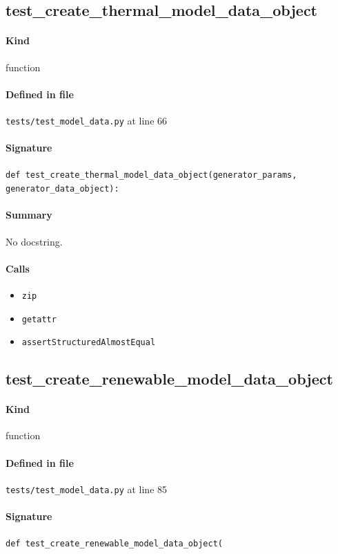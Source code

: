 \documentclass[11pt]{report}
\begin{document}
\subsection{test\_create\_thermal\_model\_data\_object}
\label{def:tests-test_model_data.py:test_create_thermal_model_data_object:L66}
\paragraph{Kind} function
\paragraph{Defined in file} \texttt{tests/test\_model\_data.py} at line 66
\paragraph{Signature} \texttt{def test\_create\_thermal\_model\_data\_object(generator\_params, generator\_data\_object):}
\paragraph{Summary} No docstring.
\paragraph{Calls}
\begin{itemize}[leftmargin=*]
  \item \texttt{zip}
  \item \texttt{getattr}
  \item \texttt{assertStructuredAlmostEqual}
\end{itemize}
\subsection{test\_create\_renewable\_model\_data\_object}
\label{def:tests-test_model_data.py:test_create_renewable_model_data_object:L85}
\paragraph{Kind} function
\paragraph{Defined in file} \texttt{tests/test\_model\_data.py} at line 85
\paragraph{Signature} \texttt{def test\_create\_renewable\_model\_data\_object(}
\end{document}
